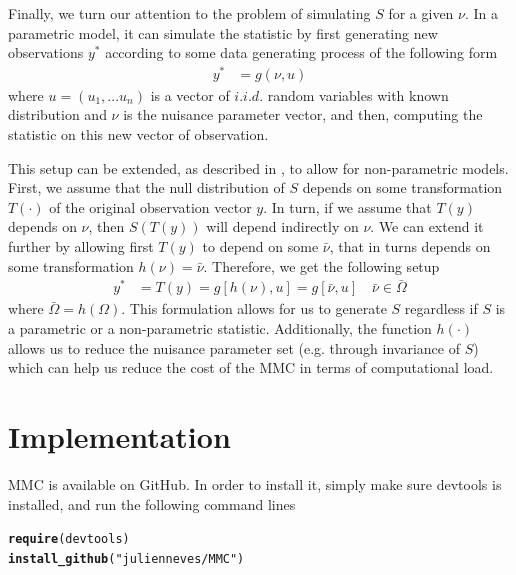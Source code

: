\documentclass[]{article}\usepackage[]{graphicx}\usepackage[]{color}
\makeatletter
\newcommand{\hlstr}[1]{\textcolor[rgb]{0.192,0.494,0.8}{#1}}%
\newcommand{\hlstd}[1]{\textcolor[rgb]{0.345,0.345,0.345}{#1}}%
\newcommand{\hlkwd}[1]{\textcolor[rgb]{0.737,0.353,0.396}{\textbf{#1}}}%
\newenvironment{kframe}{%
 \def\at@end@of@kframe{}%
 \ifinner\ifhmode%
  \def\at@end@of@kframe{\end{minipage}}%
  \begin{minipage}{\columnwidth}%
 \fi\fi%
 \def\FrameCommand##1{\hskip\@totalleftmargin \hskip-\fboxsep
 \colorbox{shadecolor}{##1}\hskip-\fboxsep
     \hskip-\linewidth \hskip-\@totalleftmargin \hskip\columnwidth}%
 \MakeFramed {\advance\hsize-\width
   \@totalleftmargin\z@ \linewidth\hsize
   \@setminipage}}%
 {\par\unskip\endMakeFramed%
 \at@end@of@kframe}
\newenvironment{knitrout}{}{} %
\newcommand{\pkg}[1]{{\normalfont\fontseries{b}\selectfont #1}}
\makeatother
\begin{document}
Finally, we turn our attention to the problem of simulating $S$ for a given $\nu$. In a parametric model, it can simulate the statistic by first generating new observations $y^*$ according to some data generating process of the following form
\begin{align}
	y^* & = g(\nu,u)
\end{align}
where $u=(u_1,...u_n)$ is a vector of $i.i.d.$ random variables with known distribution and $\nu$ is the nuisance parameter vector, and then, computing the statistic on this new vector of observation.

 This setup can be extended, as described in \cite{dufour_monte_2006}, to allow for non-parametric models. First, we assume that the null distribution of $S$ depends on some transformation $T(\cdot)$ of the original observation vector $y$. In turn, if we assume that $T(y)$ depends on $\nu$, then $S(T(y))$ will depend indirectly on $\nu$. We can extend it further by allowing first $T(y)$ to depend on some $\bar{\nu}$, that in turns depends on some transformation $h(\nu)=\bar{\nu}$. Therefore, we get the following setup
 \begin{align}
 	y^* & = T(y) = g[h(\nu), u] = g[\bar{\nu},u] \quad \bar{\nu} \in \bar{\Omega}
 \end{align}
 where $\bar{\Omega}=h(\Omega)$. This formulation allows for us to generate $S$ regardless if $S$ is a parametric or a non-parametric statistic. Additionally, the function $h(\cdot)$ allows us to reduce the nuisance parameter set (e.g. through invariance of $S$) which can help us reduce the cost of the MMC in terms of computational load.




\section{Implementation}

\pkg{MMC} is available on GitHub. In order to install it, simply make sure \pkg{devtools} \citep{wickham_devtools:_2016} is installed, and run the following command lines
\begin{knitrout}
\color{fgcolor}\begin{kframe}
\begin{alltt}
\hlkwd{require}\hlstd{(devtools)}
\hlkwd{install_github}\hlstd{(}\hlstr{"julienneves/MMC"}\hlstd{)}
\end{alltt}
\end{kframe}
\end{knitrout}
\end{document}
